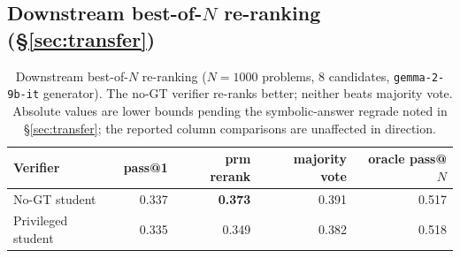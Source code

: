 \documentclass{article}
\begin{document}
\subsection{Downstream best-of-$N$ re-ranking (\S\ref{sec:transfer})}
\label{app:bon}

\begin{table}[t]
\centering
\small
\begin{tabular}{lrrrr}
\toprule
Verifier & pass@1 & prm rerank & majority vote & oracle pass@$N$ \\
\midrule
No-GT student & 0.337 & \textbf{0.373} & 0.391 & 0.517 \\
Privileged student & 0.335 & 0.349 & 0.382 & 0.518 \\
\bottomrule
\end{tabular}
\caption{Downstream best-of-$N$ re-ranking ($N=1000$ problems, 8 candidates,
\texttt{gemma-2-9b-it} generator). The no-GT verifier re-ranks better;
neither beats majority vote. Absolute values are lower bounds pending the
symbolic-answer regrade noted in \S\ref{sec:transfer}; the reported column
comparisons are unaffected in direction.}
\label{tab:bon}
\end{table}
\end{document}
